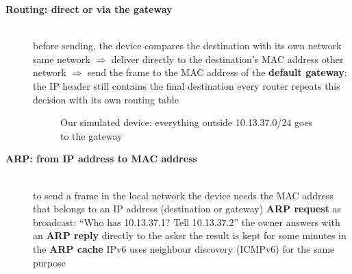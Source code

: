 \begin{description}
\item[{\rot\bf Routing: direct or via the gateway}]~\\[-\lblskip]
\bi
	\ite before sending, the device compares the destination with its own network
	\bi
		\ite same network $\Rightarrow$ deliver directly to the destination's MAC address
		\ite other network $\Rightarrow$ send the frame to the MAC address of the \textbf{default gateway}; the IP header still contains the final destination
	\ei
	\ite every router repeats this decision with its own routing table
\ei
\begin{figure}[!hbtp]
\begin{center}
\caption{Our simulated device: everything outside 10.13.37.0/24 goes to the gateway}
\end{center}
\end{figure}
\os{\newpage}

\item[{\rot\bf ARP: from IP address to MAC address}]~\\[-\lblskip]
\bi
	\ite to send a frame in the local network the device needs the MAC address that belongs to an IP address (destination or gateway)
	\ite \textbf{ARP request} as broadcast: ``Who has 10.13.37.1? Tell 10.13.37.2''
	\ite the owner answers with an \textbf{ARP reply} directly to the asker
	\ite the result is kept for some minutes in the \textbf{ARP cache}
	\ite IPv6 uses neighbour discovery (ICMPv6) for the same purpose
\ei
\os{\newpage}


\end{description}
